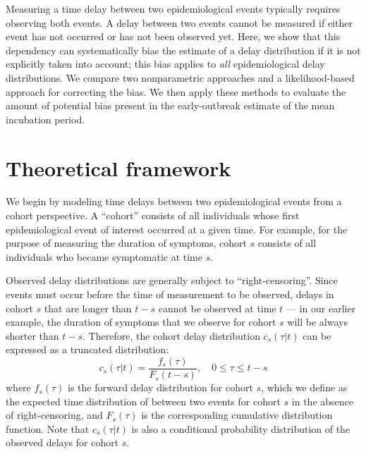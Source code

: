 \documentclass[12pt]{article}
\begin{document}
Measuring a time delay between two epidemiological events typically requires observing both events.
A delay between two events cannot be measured if either event has not occurred or has not been observed yet.
Here, we show that this dependency can systematically bias the estimate of a delay distribution if it is not explicitly taken into account;
this bias applies to \emph{all} epidemiological delay distributions.
We compare two nonparametric approaches and a likelihood-based approach for correcting the bias.
We then apply these methods to evaluate the amount of potential bias present in the early-outbreak estimate of the mean incubation period.

\section{Theoretical framework}

We begin by modeling time delays between two epidemiological events from a cohort perspective.
A ``cohort'' consists of all individuals whose first epidemiological event of interest occurred at a given time.
For example, for the purpose of measuring the duration of symptoms, cohort $s$ consists of all individuals who became symptomatic at time $s$.

Observed delay distributions are generally subject to ``right-censoring''.
Since events must occur before the time of measurement to be observed, delays in cohort $s$ that are longer than $t-s$ cannot be observed at time $t$ --- 
in our earlier example, the duration of symptoms that we observe for cohort $s$ will be always shorter than $t-s$.
Therefore, the cohort delay distribution $c_s(\tau|t)$ can be expressed as a truncated distribution:
\begin{equation}
c_s(\tau|t) = \frac{f_s(\tau)}{F_s(t-s)},\quad 0 \leq \tau \leq t-s
\label{eq:cohort}
\end{equation}
where $f_s(\tau)$ is the forward delay distribution for cohort $s$, which we define as the expected time distribution of between two events for cohort $s$ in the absence of right-censoring,
and $F_s(\tau)$ is the corresponding cumulative distribution function.
Note that $c_s(\tau|t)$ is also a conditional probability distribution of the observed delays for cohort $s$.
\end{document}
